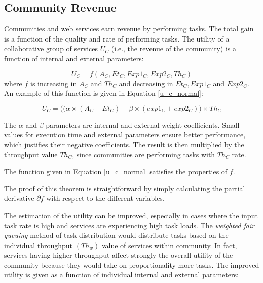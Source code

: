 \subsection{Community Revenue}

Communities and web services earn revenue by performing tasks. The total gain is a function of the quality and rate of performing tasks. The utility of a collaborative group of services $U_{C}$ (i.e., the revenue of the community) is a function of internal and external parameters:

\begin{equation}\label{u_c_general}
U_{C} = f(A_{C}, Et_{C}, Exp1_{C}, Exp2_{C}, Th_{C})
\end{equation}
%
where $f$ is increasing in $A_{C}$ and $Th_{C}$ and decreasing in $Et_{C}, Exp1_{C}$ and $Exp2_{C}$. An example of this function is given in Equation \ref{u_c_normal}:

\begin{equation}\label{u_c_normal}
U_{C} = \big((\alpha \times (A_{C} - Et_{C}) - \beta \times (exp1_{C} + exp2_{C})\big) \times Th_{C}
\end{equation}

The $\alpha$ and $\beta$ parameters are internal and external weight coefficients. Small values for execution time and external parameters ensure better performance, which justifies their negative coefficients. The result is then multiplied by the throughput value $Th_{C}$, since communities are performing tasks with $Th_{C}$ rate.

\begin{theorem}
The function given in Equation \ref{u_c_normal} satisfies the properties of $f$.
\end{theorem}

The proof of this theorem is straightforward by simply calculating the partial derivative $\partial f$ with respect to the different variables.


The estimation of the utility can be improved, especially in cases where the input task rate is high and services are experiencing high task loads. The \emph{weighted fair queuing} method of task distribution would distribute tasks based on the individual throughput $(Th_{w})$ value of services within community. In fact, services having higher throughput affect strongly the overall utility of the community because they would take on proportionality more tasks. The improved utility is given as a function of individual internal and external parameters:


